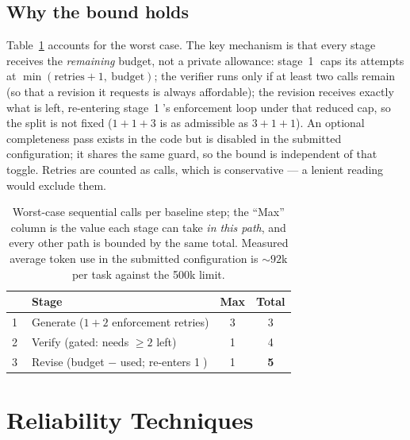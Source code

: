 \documentclass{article}
\begin{document}
\subsection{Why the bound holds}

Table~\ref{tab:budget} accounts for the worst case. The key mechanism
is that every stage receives the \emph{remaining} budget, not a private
allowance: stage~\textcircled{1} caps its attempts at
$\min(\text{retries}+1,\ \text{budget})$; the verifier runs only if at
least two calls remain (so that a revision it requests is always
affordable); the revision receives exactly what is left, re-entering
stage~\textcircled{1}'s enforcement loop under that reduced cap, so the
split is not fixed ($1{+}1{+}3$ is as admissible as $3{+}1{+}1$). An
optional completeness pass exists in the code but is disabled in the
submitted configuration; it shares the same guard, so the bound is
independent of that toggle. Retries are counted as calls, which is
conservative --- a lenient reading would exclude them.

\begin{table}[t]
\centering
\begin{tabular}{@{}llcc@{}}
\toprule
& Stage & Max & Total \\
\midrule
\textcircled{1} & Generate ($1 + 2$ enforcement retries) & 3 & 3 \\
\textcircled{2} & Verify (gated: needs $\geq 2$ left)    & 1 & 4 \\
\textcircled{3} & Revise (budget $-$ used; re-enters \textcircled{1}) & 1 & \textbf{5} \\
\bottomrule
\end{tabular}
\caption{Worst-case sequential calls per baseline step; the ``Max''
column is the value each stage can take \emph{in this path}, and every
other path is bounded by the same total. Measured average token use in
the submitted configuration is ${\sim}92$k per task against the 500k
limit.}
\label{tab:budget}
\end{table}

\section{Reliability Techniques}
\label{sec:techniques}
\end{document}

